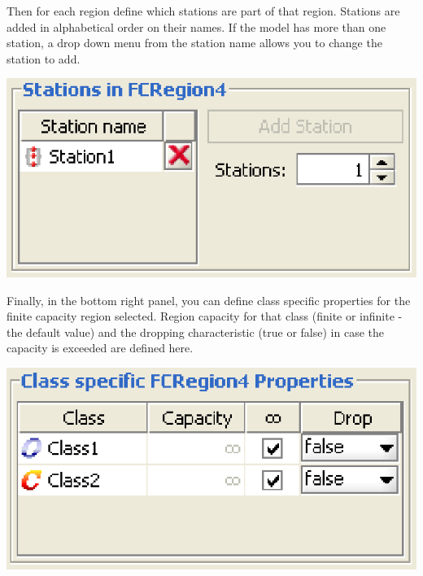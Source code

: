 Then for each region define which stations are part of that region. Stations are added in alphabetical order on their names. If the model has more than one station, a drop down menu from the station name allows you to change the station to add.
\begin{center}
\includegraphics[scale=.5]{img/jsim/station_selection.eps}
\end{center}
Finally, in the bottom right panel, you can define class specific properties for the finite capacity region selected. Region capacity for that class (finite or infinite -the default value) and the dropping characteristic (true or false) in case the capacity is exceeded are defined here.
\begin{center}
\includegraphics[scale=.5]{img/jsim/class_selection.eps}
\end{center}

